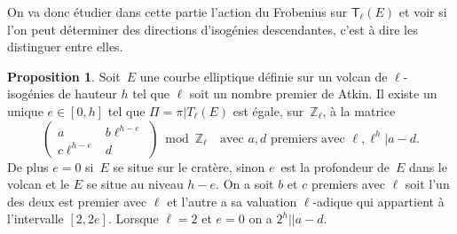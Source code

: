 \documentclass[10pt,a4paper]{book}
\theoremstyle{plain}
\theoremstyle{definition}
\theoremstyle{definition}
\theoremstyle{definition}
\newtheorem{prop}[thm]{Proposition}
\theoremstyle{definition}
\theoremstyle{remark}
\theoremstyle{remark}
\theoremstyle{definition}
\begin{document}
On va donc étudier dans cette partie l'action du Frobenius sur 
$\mathsf{T}_{\ell}(E)$ et voir si l'on peut déterminer des directions 
d'isogénies descendantes, c'est à dire les distinguer entre elles.
\begin{prop}\label{pro:mat:fro:atk}
Soit~$E$ une courbe elliptique définie sur un volcan de $\ell$-isogénies de 
hauteur $h$ tel que $\ell$ soit un nombre premier de Atkin. Il existe un unique
$e \in [ 0, h]$ tel que $\Pi=\pi|T_{\ell}(E)$ est égale, sur~$\mathbb{Z}_{\ell}$, à
 la matrice 
\begin{equation*}
\left ( \begin{matrix}a & b\ell^{h-e} \\ c\ell^{h-e} & d
\end{matrix}\right ) \bmod \mathbb{Z}_{\ell} \quad \text{avec }a,d \text{ premiers avec }\ell, \ell^{h} |a-d.
\end{equation*}
De plus $e = 0$ si~$E$ se situe sur le cratère, sinon $e$~est la profondeur 
de~$E$ dans le volcan et le $E$ se situe au niveau $h-e$.
On a soit $b$ et $c$ premiers avec $\ell$ soit l'un des deux est premier avec 
$\ell$ et l'autre a sa valuation $\ell$-adique qui appartient à l'intervalle 
$[2,2e]$. Lorsque $\ell=2$ et $e=0$ on a $2^{h} || a-d$.
\end{prop}
\end{document}
